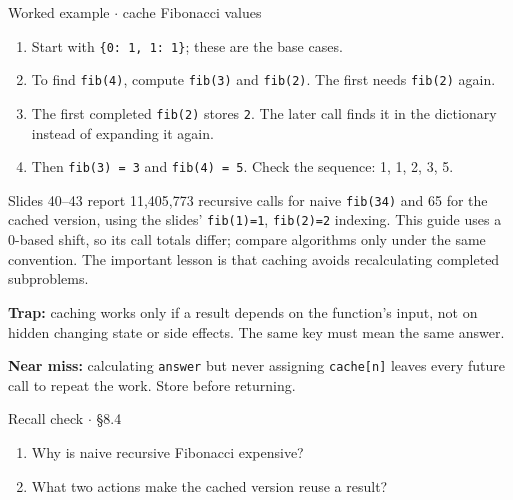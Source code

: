 \documentclass[11pt]{article}
\begin{document}
\begin{keepsection}
\begin{workedbox}{Worked example \ensuremath{\cdot} cache Fibonacci values}
\begin{enumerate}
\item Start with \texttt{\{0: 1, 1: 1\}}; these are the base cases.
\item To find \texttt{fib(4)}, compute \texttt{fib(3)} and \texttt{fib(2)}. The first needs \texttt{fib(2)} again.
\item The first completed \texttt{fib(2)} stores \texttt{2}. The later call finds it in the dictionary instead of expanding it again.
\item Then \texttt{fib(3) = 3} and \texttt{fib(4) = 5}. Check the sequence: 1, 1, 2, 3, 5.
\end{enumerate}
\end{workedbox}

Slides 40–43 report 11,405,773 recursive calls for naive \texttt{fib(34)} and 65 for the cached version, using the slides’ \texttt{fib(1)=1}, \texttt{fib(2)=2} indexing. This guide uses a 0-based shift, so its call totals differ; compare algorithms only under the same convention. The important lesson is that caching avoids recalculating completed subproblems.

\begin{notebox}\textbf{Trap:} caching works only if a result depends on the function’s input, not on hidden changing state or side effects. The same key must mean the same answer.\end{notebox}

\begin{notebox}\textbf{Near miss:} calculating \texttt{answer} but never assigning \texttt{cache[n]} leaves every future call to repeat the work. Store before returning.\end{notebox}

\begin{recallbox}{Recall check \ensuremath{\cdot} §8.4}
\begin{enumerate}
\item Why is naive recursive Fibonacci expensive?
\item What two actions make the cached version reuse a result?
\end{enumerate}

\end{recallbox}
\end{keepsection}
\end{document}
